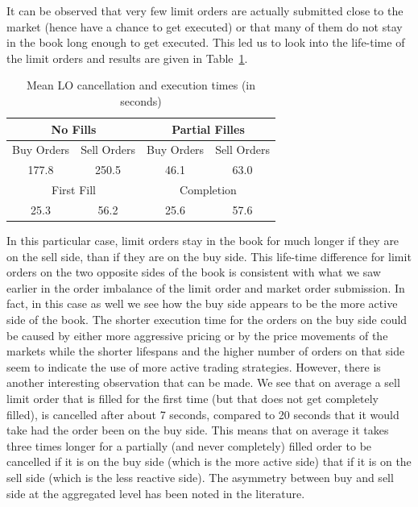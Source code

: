 It can be observed that very few limit orders are actually submitted close to the market (hence have a chance to get executed) or that many of them do not stay in the book long enough to get executed. This led us to look into the life-time of the limit orders and results are given in Table~\ref{tab:meanlo}.
	\begin{table}[!ht]
	\centering
	\caption{Mean LO cancellation and execution times (in seconds)\label{tab:meanlo}}
	\begin{tabular}{cccc}
	\multicolumn{2}{c}{No Fills} & \multicolumn{2}{c}{Partial Filles} \\ \hline
	Buy Orders & Sell Orders & Buy Orders & Sell Orders \\ \hline
	177.8 & 250.5 & 46.1 & 63.0 \\ \hline
	\multicolumn{2}{c}{First Fill} & \multicolumn{2}{c}{Completion} \\ \hline
	 25.3 & 56.2 & 25.6 & 57.6
	\end{tabular}
	\end{table}
In this particular case, limit orders stay in the book for much longer if they are on the sell side, than if they are on the buy side. This life-time difference for limit orders on the two opposite sides of the book is consistent with what we saw earlier in the order imbalance of the limit order and market order submission. In fact, in this case as well we see how the buy side appears to be the more active side of the book. The shorter execution time for the orders on the buy side could be caused by either more aggressive pricing or by the price movements of the markets while the shorter lifespans and the higher number of orders on that side seem to indicate the use of more active trading strategies. However, there is another interesting observation that can be made. We see that on average a sell limit order that is filled for the first time (but that does not get completely filled), is cancelled after about 7 seconds, compared to 20 seconds that it would take had the order been on the buy side. This means that on average it takes three times longer for a partially (and never completely) filled order to be cancelled if it is on the buy side (which is the more active side) that if it is on the sell side (which is the less reactive side). The asymmetry between buy and sell side at the aggregated level has been noted in the literature.


